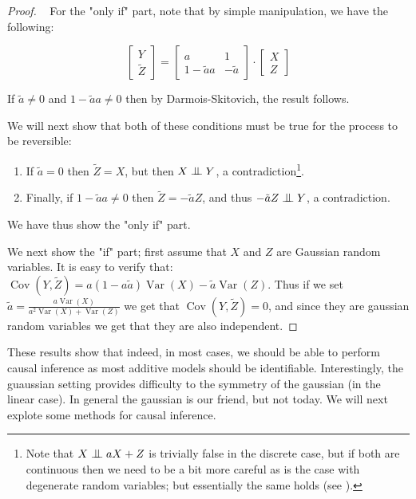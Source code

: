 \begin{proof} 
    ~
For the "only if" part, note that by simple manipulation, we have the following:

\[
    \begin{bmatrix}
        Y \\
        \tilde{Z}
    \end{bmatrix}
    =
    \begin{bmatrix}
    a & 1 \\
    1 - \tilde{a}a & -\tilde{a}
    \end{bmatrix}
    \cdot
    \begin{bmatrix}
        X \\
        Z
    \end{bmatrix}
\]

If $\tilde{a} \neq 0$ and $1 - \tilde{a}a \neq 0$ then by Darmois-Skitovich, the result follows.

We will next show that both of these conditions must be true for the process to be reversible:

\begin{enumerate}
    \item If $\tilde{a} = 0$ then $\tilde{Z} = X$, but then $X \bigCI Y$, a contradiction\footnote{
        Note that $X \bigCI aX + Z$ is trivially false 
        in the discrete case, but if both are continuous then we need to be a bit more careful as is the 
        case with degenerate random variables; but essentially the same holds (see \cite{Peters2008diploma}).
    }.
    \item Finally, if $1 - \tilde{a}a \neq 0$ then $\tilde{Z} = -\tilde{a}Z$, and thus 
    $-\tilde{a}Z \bigCI Y$, a contradiction.
\end{enumerate}

We have thus show the "only if" part. 

We next show the "if" part; first assume that $X$ and $Z$ are Gaussian random variables. 
It is easy to verify that:
$\operatorname{Cov}(Y, \tilde{Z}) = a(1 - a\tilde{a})\operatorname{Var}(X) - \tilde{a}\operatorname{Var}(Z)$.
Thus if we set $\tilde{a} = \frac{a \operatorname{Var}(X)}{a^2 \operatorname{Var}(X) + \operatorname{Var}(Z)}$ 
we get that $\operatorname{Cov}(Y, \tilde{Z}) = 0$, and since they are gaussian random variables we get 
that they are also independent.

\end{proof}

These results show that indeed, in most cases, we should be able to perform causal inference as most 
additive models should be identifiable. Interestingly, the guaussian setting provides difficulty 
to the symmetry of the gaussian (in the linear case). In general the gaussian is our friend, but not today.
We will next explote some methods for causal inference.

